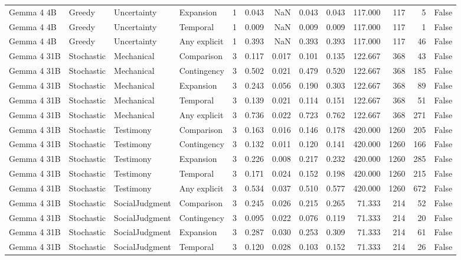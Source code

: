 \begin{tabular}{llllrrrrrrrrr}
Gemma 4 4B & Greedy & Uncertainty & Expansion & 1 & 0.043 & NaN & 0.043 & 0.043 & 117.000 & 117 & 5 & False \\
Gemma 4 4B & Greedy & Uncertainty & Temporal & 1 & 0.009 & NaN & 0.009 & 0.009 & 117.000 & 117 & 1 & False \\
Gemma 4 4B & Greedy & Uncertainty & Any explicit & 1 & 0.393 & NaN & 0.393 & 0.393 & 117.000 & 117 & 46 & False \\
Gemma 4 31B & Stochastic & Mechanical & Comparison & 3 & 0.117 & 0.017 & 0.101 & 0.135 & 122.667 & 368 & 43 & False \\
Gemma 4 31B & Stochastic & Mechanical & Contingency & 3 & 0.502 & 0.021 & 0.479 & 0.520 & 122.667 & 368 & 185 & False \\
Gemma 4 31B & Stochastic & Mechanical & Expansion & 3 & 0.243 & 0.056 & 0.190 & 0.303 & 122.667 & 368 & 89 & False \\
Gemma 4 31B & Stochastic & Mechanical & Temporal & 3 & 0.139 & 0.021 & 0.114 & 0.151 & 122.667 & 368 & 51 & False \\
Gemma 4 31B & Stochastic & Mechanical & Any explicit & 3 & 0.736 & 0.022 & 0.723 & 0.762 & 122.667 & 368 & 271 & False \\
Gemma 4 31B & Stochastic & Testimony & Comparison & 3 & 0.163 & 0.016 & 0.146 & 0.178 & 420.000 & 1260 & 205 & False \\
Gemma 4 31B & Stochastic & Testimony & Contingency & 3 & 0.132 & 0.011 & 0.120 & 0.141 & 420.000 & 1260 & 166 & False \\
Gemma 4 31B & Stochastic & Testimony & Expansion & 3 & 0.226 & 0.008 & 0.217 & 0.232 & 420.000 & 1260 & 285 & False \\
Gemma 4 31B & Stochastic & Testimony & Temporal & 3 & 0.171 & 0.024 & 0.152 & 0.198 & 420.000 & 1260 & 215 & False \\
Gemma 4 31B & Stochastic & Testimony & Any explicit & 3 & 0.534 & 0.037 & 0.510 & 0.577 & 420.000 & 1260 & 672 & False \\
Gemma 4 31B & Stochastic & SocialJudgment & Comparison & 3 & 0.245 & 0.026 & 0.215 & 0.265 & 71.333 & 214 & 52 & False \\
Gemma 4 31B & Stochastic & SocialJudgment & Contingency & 3 & 0.095 & 0.022 & 0.076 & 0.119 & 71.333 & 214 & 20 & False \\
Gemma 4 31B & Stochastic & SocialJudgment & Expansion & 3 & 0.287 & 0.030 & 0.253 & 0.309 & 71.333 & 214 & 61 & False \\
Gemma 4 31B & Stochastic & SocialJudgment & Temporal & 3 & 0.120 & 0.028 & 0.103 & 0.152 & 71.333 & 214 & 26 & False \\

\end{tabular}
